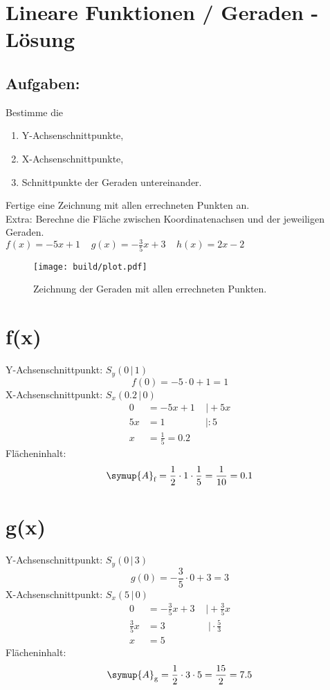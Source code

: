 


\section*{Lineare Funktionen / Geraden - Lösung}
\subsection*{Aufgaben:}
Bestimme die
\begin{enumerate}
      \item Y-Achsenschnittpunkte,
      \item X-Achsenschnittpunkte,
      \item Schnittpunkte der Geraden untereinander.
\end{enumerate}
Fertige eine Zeichnung mit allen errechneten Punkten an.\\
Extra: Berechne die Fläche zwischen Koordinatenachsen und der jeweiligen Geraden.
\\
$f(x)=-5x+1 \;\;\;\; g(x)=-\frac{3}{5}x+3 \;\;\;\; h(x)=2x-2$

\begin{figure}
      \centering
      \texttt{[image: build/plot.pdf]}
      \caption{Zeichnung der Geraden mit allen errechneten Punkten.}
\end{figure}

\newpage
\section*{f(x)}
Y-Achsenschnittpunkt: $S_y (0\,|\,1)$
\begin{equation}
      f(0)=-5\cdot 0+1=1
\end{equation}
X-Achsenschnittpunkt: $S_x (0.2\,|\,0)$
\begin{align}
      0&=-5x+1\;\;\;\;|\!+\!5x\\
      5x&=1\;\;\;\;\;\;\;\;\;\;\;\;\;\;\;|\!:\!5\\
      x&=\frac{1}{5}=0.2
\end{align}
Flächeninhalt:
\begin{equation}
      \symup{A}_\text{f} = \frac{1}{2}\cdot1\cdot\frac{1}{5}=\frac{1}{10}=0.1
\end{equation}

\section*{g(x)}
Y-Achsenschnittpunkt: $S_y (0\,|\,3)$
\begin{equation}
      g(0)=-\frac{3}{5}\cdot 0+3=3
\end{equation}
X-Achsenschnittpunkt: $S_x (5\,|\,0)$
\begin{align}
      0&=-\frac{3}{5}x+3\;\;\;\;|\!+\!\frac{3}{5}x\\
      \frac{3}{5}x&=3\;\;\;\;\;\;\;\;\;\;\;\;\;\;\;\;|\!\cdot\!\frac{5}{3}\\
      x&=5
\end{align}
Flächeninhalt:
\begin{equation}
      \symup{A}_\text{g} = \frac{1}{2}\cdot3\cdot5=\frac{15}{2}=7.5
\end{equation}

